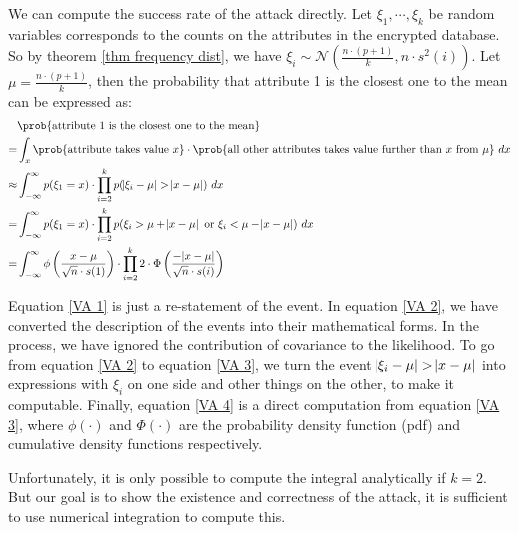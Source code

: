 We can compute the success rate of the attack directly. Let $\xi_1, \cdots, \xi_k$ be random variables corresponds to the counts on the attributes in the encrypted database. So by theorem \ref{thm frequency dist}, we have $\xi_i \sim \mathcal{N}(\frac{n \cdot (p+1)}{k}, n \cdot s^2(i))$. Let $\mu = \frac{n \cdot (p+1)}{k}$, then the probability that attribute 1 is the closest one to the mean can be expressed as:
\begin{align}
  & \prob{\text{attribute 1 is the closest one to the mean}} \\
= & \int_{x} \prob{\text{attribute takes value } x} \cdot \prob{\text{all other attributes takes value further than } x \text{ from } \mu} \ dx \label{VA 1} \\
\approx & \int_{-\infty}^{\infty} p(\xi_1 = x) \cdot \prod_{i = 2}^{k} p(\abs{\xi_i - \mu} > \abs{x - \mu}) \ dx \label{VA 2}\\
= & \int_{-\infty}^{\infty} p(\xi_1 = x) \cdot \prod_{i = 2}^{k} p(\xi_i > \mu + \abs{x - \mu} \text{ or } \xi_i < \mu - \abs{x - \mu}) \ dx \label{VA 3} \\
= & \int_{-\infty}^{\infty} \phi\left(\frac{x - \mu}{\sqrt{n} \cdot s(1)}\right) \cdot \prod_{i = 2}^{k} 2 \cdot \Phi\left(\frac{- \abs{x - \mu}}{\sqrt{n} \cdot s(i)}\right) \label{VA 4}
\end{align}

Equation \ref{VA 1} is just a re-statement of the event. In equation \ref{VA 2}, we have converted the description of the events into their mathematical forms. In the process, we have ignored the contribution of covariance to the likelihood. To go from equation \ref{VA 2} to equation \ref{VA 3}, we turn the event $\abs{\xi_i - \mu} > \abs{x - \mu}$ into expressions with $\xi_i$ on one side and other things on the other, to make it computable. Finally, equation \ref{VA 4} is a direct computation from equation \ref{VA 3}, where $\phi(\cdot)$ and $\Phi(\cdot)$ are the probability density function (pdf) and cumulative density functions respectively.

Unfortunately, it is only possible to compute the integral analytically if $k = 2$. But our goal is to show the existence and correctness of the attack, it is sufficient to use numerical integration to compute this.

